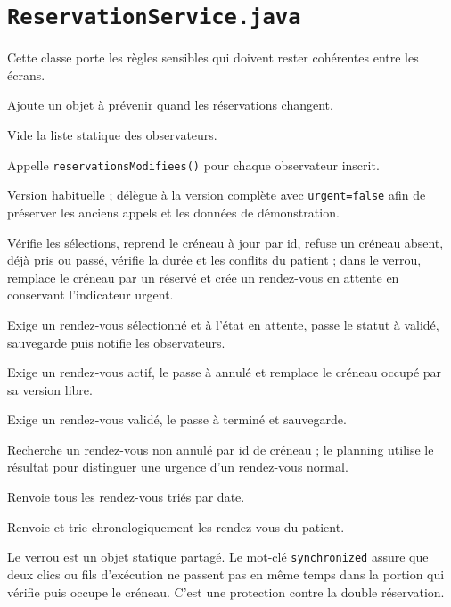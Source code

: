 \documentclass[11pt,a4paper]{report}
\begin{document}
\section{\texttt{ReservationService.java}}
Cette classe porte les règles sensibles qui doivent rester cohérentes entre les écrans.
\begin{description}[leftmargin=4.7cm,style=nextline]
\item[\texttt{ajouterEcouteur(ecouteur)}] Ajoute un objet à prévenir quand les réservations changent.
\item[\texttt{viderEcouteurs()}] Vide la liste statique des observateurs.
\item[\texttt{notifierChangement()}] Appelle \texttt{reservationsModifiees()} pour chaque observateur inscrit.
\item[\texttt{reserver(patient, acte, creneau, notes)}] Version habituelle ; délègue à la version complète avec \texttt{urgent=false} afin de préserver les anciens appels et les données de démonstration.
\item[\texttt{reserver(patient, acte, creneau, notes, urgent)}] Vérifie les sélections, reprend le créneau à jour par id, refuse un créneau absent, déjà pris ou passé, vérifie la durée et les conflits du patient ; dans le verrou, remplace le créneau par un réservé et crée un rendez-vous en attente en conservant l'indicateur urgent.
\item[\texttt{valider(rdv)}] Exige un rendez-vous sélectionné et à l'état en attente, passe le statut à validé, sauvegarde puis notifie les observateurs.
\item[\texttt{annuler(rdv)}] Exige un rendez-vous actif, le passe à annulé et remplace le créneau occupé par sa version libre.
\item[\texttt{terminer(rdv)}] Exige un rendez-vous validé, le passe à terminé et sauvegarde.
\item[\texttt{rendezVousDuCreneau(creneau)}] Recherche un rendez-vous non annulé par id de créneau ; le planning utilise le résultat pour distinguer une urgence d'un rendez-vous normal.
\item[\texttt{lister()}] Renvoie tous les rendez-vous triés par date.
\item[\texttt{listerParPatient(patient)}] Renvoie et trie chronologiquement les rendez-vous du patient.
\end{description}

Le verrou est un objet statique partagé. Le mot-clé \texttt{synchronized} assure que deux clics ou fils d'exécution ne passent pas en même temps dans la portion qui vérifie puis occupe le créneau. C'est une protection contre la double réservation.
\end{document}
